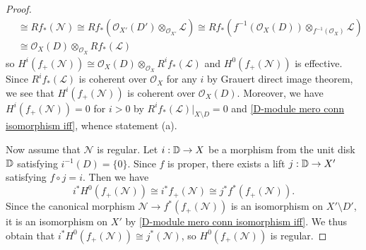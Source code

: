 \begin{proof}
\begin{align*}
&\cong Rf_*(\mathscr{N})\cong Rf_*(\mathscr{O}_{X'}(D')\otimes_{\mathscr{O}_{X'}}\mathscr{L})\cong Rf_*(f^{-1}(\mathscr{O}_X(D))\otimes_{f^{-1}(\mathscr{O}_X)}\mathscr{L})\\
&\cong\mathscr{O}_X(D)\otimes_{\mathscr{O}_X}Rf_*(\mathscr{L})
\end{align*}
so $H^i(f_+(\mathscr{N}))\cong\mathscr{O}_X(D)\otimes_{\mathscr{O}_X}R^if_*(\mathscr{L})$ and $H^0(f_+(\mathscr{N}))$ is effective. Since $R^if_*(\mathscr{L})$ is coherent over $\mathscr{O}_X$ for any $i$ by Grauert direct image theorem, we see that $H^i(f_+(\mathscr{N}))$ is coherent over $\mathscr{O}_X(D)$. Moreover, we have $H^i(f_+(\mathscr{N}))=0$ for $i>0$ by $R^if_*(\mathscr{L})|_{X\setminus D}=0$ and \cref{D-module mero conn isomorphism iff}, whence statement (a).\par
Now assume that $\mathscr{N}$ is regular. Let $i:\mathbb{D}\to X$ be a morphism from the unit disk $\mathbb{D}$ satisfying $i^{-1}(D)=\{0\}$. Since $f$ is proper, there exists a lift $j:\mathbb{D}\to X'$ satisfying $f\circ j=i$. Then we have
\[i^*H^0(f_+(\mathscr{N}))\cong i^*f_+(\mathscr{N})\cong j^*f^*(f_+(\mathscr{N})).\]
Since the canonical morphism $\mathscr{N}\to f^*(f_+(\mathscr{N}))$ is an isomorphism on $X'\setminus D'$, it is an isomorphism on $X'$ by \cref{D-module mero conn isomorphism iff}. We thus obtain that $i^*H^0(f_+(\mathscr{N}))\cong j^*(\mathscr{N})$, so $H^0(f_+(\mathscr{N}))$ is regular.
\end{proof}

